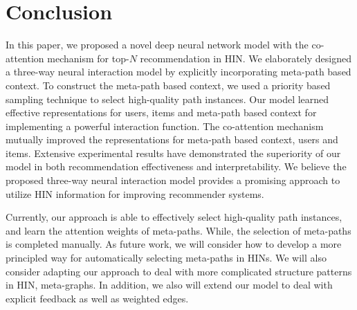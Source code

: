 \section{Conclusion}

In this paper, we proposed a novel deep neural network model with the co-attention mechanism for top-$N$ recommendation in HIN. 
We elaborately designed a three-way neural interaction model by explicitly incorporating meta-path based context.
 To construct the meta-path based context, we used a priority based sampling technique to select high-quality path instances.
 Our model learned effective representations for users, items and meta-path based context for implementing a powerful interaction function.
The co-attention mechanism  mutually improved the representations for  meta-path based context, users and items. 
Extensive experimental results have demonstrated  the superiority  of our model in both recommendation effectiveness and interpretability. 
We believe the proposed three-way neural interaction model provides a promising approach to utilize HIN information for improving recommender systems. 

Currently, our approach is able to effectively select high-quality path instances, and  learn the attention weights of meta-paths. While, the selection of meta-paths is completed manually.  As future work, we will consider how to develop a more principled way for automatically selecting meta-paths in HINs. We will also consider adapting our approach to deal with more complicated structure patterns in HIN, \eg meta-graphs. In addition, we also will extend our model to deal with explicit feedback as well as weighted edges.